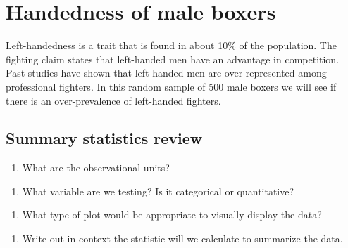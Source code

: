 \documentclass[
]{report}
\providecommand{\tightlist}{%
  \setlength{\itemsep}{0pt}\setlength{\parskip}{0pt}}
\begin{document}
\hypertarget{handedness-of-male-boxers-1}{%
\section{Handedness of male boxers}\label{handedness-of-male-boxers-1}}

Left-handedness is a trait that is found in about 10\% of the population. The fighting claim states that left-handed men have an advantage in competition. Past studies have shown that left-handed men are over-represented among professional fighters. In this random sample of 500 male boxers we will see if there is an over-prevalence of left-handed fighters.

\hypertarget{summary-statistics-review}{%
\subsection{Summary statistics review}\label{summary-statistics-review}}

\begin{enumerate}
\def\labelenumi{\arabic{enumi}.}
\tightlist
\item
  What are the observational units?
\end{enumerate}

\vspace{0.5in}

\begin{enumerate}
\def\labelenumi{\arabic{enumi}.}
\setcounter{enumi}{1}
\tightlist
\item
  What variable are we testing? Is it categorical or quantitative?
\end{enumerate}

\vspace{1in}

\begin{enumerate}
\def\labelenumi{\arabic{enumi}.}
\setcounter{enumi}{2}
\tightlist
\item
  What type of plot would be appropriate to visually display the data?
\end{enumerate}

\vspace{1in}

\begin{enumerate}
\def\labelenumi{\arabic{enumi}.}
\setcounter{enumi}{3}
\tightlist
\item
  Write out in context the statistic will we calculate to summarize the data.
\end{enumerate}
\end{document}
